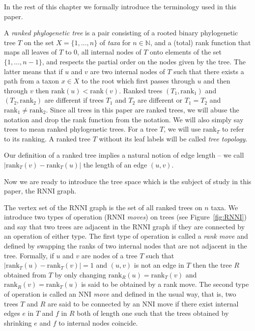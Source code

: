 \documentclass{amsart}
\newcommand{\rank}{\mathrm{rank}}
\newcommand{\nni}{\mathrm{NNI}}
\newcommand{\rnni}{\mathrm{RNNI}}
\begin{document}
In the rest of this chapter we formally introduce the terminology used in this paper.

A \emph{ranked phylogenetic tree} is a pair consisting of a rooted binary phylogenetic tree $T$ on the set $X = \{1, \ldots, n\}$ of \emph{taxa} for $n \in \mathbb N$, and a (total) rank function that maps all leaves of $T$ to $0$, all internal nodes of $T$ onto elements of the set $\{1, \ldots, n-1\}$, and respects the partial order on the nodes given by the tree.
The latter means that if $u$ and $v$ are two internal nodes of $T$ such that there exists a path from a taxon $x \in X$ to the root which first passes through $u$ and then through $v$ then $\rank(u) < \rank(v)$.
Ranked trees $(T_1, \rank_1)$ and $(T_2, \rank_2)$ are different if trees $T_1$ and $T_2$ are different or $T_1 = T_2$ and $\rank_1 \neq \rank_2$.
Since all trees in this paper are ranked trees, we will abuse the notation and drop the rank function from the notation.
We will also simply say trees to mean ranked phylogenetic trees.
For a tree $T$, we will use $\rank_T$ to refer to its ranking.
A ranked tree $T$ without its leaf labels will be called \emph{tree topology}.

Our definition of a ranked tree implies a natural notion of edge length -- we call $|\rank_T(v) - \rank_T(u)|$ the length of an edge $(u, v)$.

Now we are ready to introduce the tree space which is the subject of study in this paper, the $\rnni$ graph.

The vertex set of the $\rnni$ graph is the set of all ranked trees on $n$ taxa.
We introduce two types of operation ($\rnni$ \emph{moves}) on trees (see Figure~\ref{fig:RNNI}) and say that two trees are adjacent in the $\rnni$ graph if they are connected by an operation of either type.
The first type of operation is called a \emph{rank move} and defined by swapping the ranks of two internal nodes that are not adjacent in the tree.
Formally, if $u$ and $v$ are nodes of a tree $T$ such that $|\rank_T(u) - \rank_T(v)| = 1$ and $(u, v)$ is not an edge in $T$ then the tree $R$ obtained from $T$ by only changing $\rank_R(u) = \rank_T(v)$ and $\rank_R(v) = \rank_T(u)$ is said to be obtained by a rank move.
The second type of operation is called an $\nni$ \emph{move} and defined in the usual way, that is, two trees $T$ and $R$ are said to be connected by an $\nni$ move if there exist internal edges $e$ in $T$ and $f$ in $R$ both of length one such that the trees obtained by shrinking $e$ and $f$ to internal nodes coincide.
\end{document}
